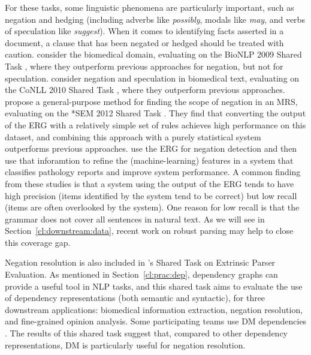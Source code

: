 \documentclass[output=paper,nonflat]{langsci/langscibook}
\begin{document}
For these tasks, some linguistic phenomena are particularly important,
such as negation and hedging
(including adverbs like \textit{possibly}, modals like \textit{may}, and verbs of speculation like \textit{suggest}).
When it comes to identifying facts asserted in a document,
a clause that has been negated or hedged should be treated with caution.
\citet{mackinlay2012biomed} consider the biomedical domain,
evaluating on the BioNLP 2009 Shared Task \citep{kim2009task},
where they outperform previous approaches for negation, but not for speculation.
\citet{velldal2012specneg} consider negation and speculation in biomedical text,
evaluating on the CoNLL 2010 Shared Task \citep{farkas2010task},
where they outperform previous approaches.
\citet{packard2014neg} propose a general-purpose method for finding the scope of negation in an MRS,
evaluating on the *SEM 2012 Shared Task \citep{morante2012task}.
They find that converting the output of the ERG with a relatively simple set of rules
achieves high performance on this dataset,
and combining this approach with a purely statistical system
outperforms previous approaches.
\citet{zamaraeva2018pathology} use the ERG for negation detection and then
use that inforamtion to refine the (machine-learning) features in a 
system that classifies pathology reports and improve system performance.
A common finding from these studies
is that a system using the output of the ERG
tends to have high precision (items identified by the system tend to be correct)
but low recall (items are often overlooked by the system).
One reason for low recall is that the grammar does not cover all sentences in natural text.
As we will see in Section~\ref{cl:downstream:data},
recent work on robust parsing may help to close this coverage gap.

Negation resolution is also included in \citet{oepen2017extrinsic}'s
Shared Task on Extrinsic Parser Evaluation.
As mentioned in Section~\ref{cl:prac:dep},
dependency graphs can provide a useful tool in NLP tasks,
and this shared task aims to evaluate the use of dependency representations (both semantic and syntactic),
for three downstream applications:
biomedical information extraction, negation resolution, and fine-grained opinion analysis.
Some participating teams use DM dependencies \citep{schuster2017dep,chen2017dep}.
The results of this shared task suggest that,
compared to other dependency representations,
DM is particularly useful for negation resolution.
\end{document}
